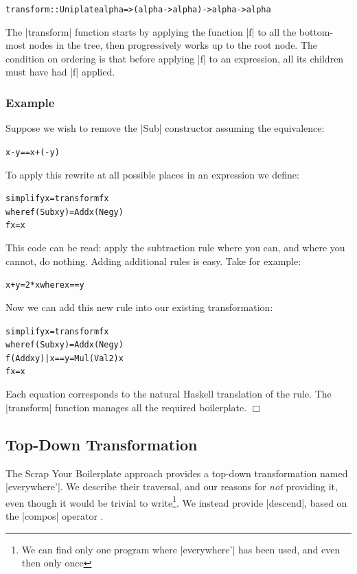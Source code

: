 \documentclass[preprint]{sigplanconf}
\let\cite=\citep
\newcounter{exmp}
\newcommand{\yesexample}{\subsubsection*{Example \arabic{exmp}}\refstepcounter{exmp}}
\newcommand{\noexample}{\hfill$\Box$}
\newenvironment{code}{\begin{alltt}\small}{\end{alltt}}
\newenvironment{example}{\yesexample}{\noexample}
\newcommand{\ignore}{}
\begin{document}
\begin{code}
transform :: Uniplate alpha => (alpha -> alpha) -> alpha -> alpha
\end{code}

The |transform| function starts by applying the function |f| to all the bottom-most nodes in the tree, then progressively works up to the root node. The condition on ordering is that before applying |f| to an expression, all its children must have had |f| applied.

\begin{example}
\label{ex:simplify}
Suppose we wish to remove the |Sub| constructor assuming the equivalence:

\ignore\begin{code}
x - y == x + (- y)
\end{code}

To apply this rewrite at all possible places in an expression we define:

\begin{code}
simplify x = transform f x
    where  f (Sub x y)  = Add x (Neg y)
           f x          = x
\end{code}

This code can be read: apply the subtraction rule where you can, and where you cannot, do nothing. Adding additional rules is easy. Take for example:

\ignore\begin{code}
x + y = 2 * x       where x == y
\end{code}

Now we can add this new rule into our existing transformation:

\begin{code}
simplify x = transform f x
    where  f (Sub x y)           = Add x (Neg y)
           f (Add x y) | x == y  = Mul (Val 2) x
           f x                   = x
\end{code}

Each equation corresponds to the natural Haskell translation of the rule. The |transform| function manages all the required boilerplate.
\end{example}

\subsection{Top-Down Transformation}

The Scrap Your Boilerplate approach \cite{lammel:syb} provides a top-down transformation named |everywhere'|. We describe their traversal, and our reasons for \textit{not} providing it, even though it would be trivial to write\footnote{We can find only one program where |everywhere'| has been used, and even then only once}. We instead provide |descend|, based on the |compos| operator \cite{bringert:compos}.
\end{document}
